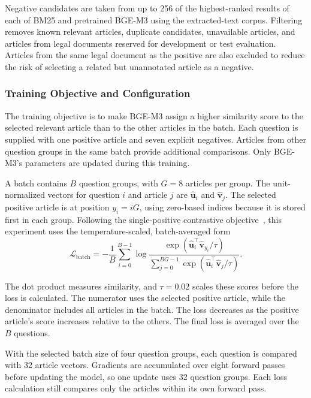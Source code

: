 Negative candidates are taken from up to 256 of the highest-ranked results of each of BM25 and pretrained BGE-M3 using the extracted-text corpus. Filtering removes known relevant articles, duplicate candidates, unavailable articles, and articles from legal documents reserved for development or test evaluation. Articles from the same legal document as the positive are also excluded to reduce the risk of selecting a related but unannotated article as a negative.




\subsubsection{Training Objective and Configuration}

The training objective is to make BGE-M3 assign a higher similarity score to the selected relevant article than to the other articles in the batch. Each question is supplied with one positive article and seven explicit negatives. Articles from other question groups in the same batch provide additional comparisons. Only BGE-M3's parameters are updated during this training.

A batch contains \(B\) question groups, with \(G=8\) articles per group. The unit-normalized vectors for question \(i\) and article \(j\) are \(\widehat{\mathbf{u}}_i\) and \(\widehat{\mathbf{v}}_j\). The selected positive article is at position \(y_i=iG\), using zero-based indices because it is stored first in each group. Following the single-positive contrastive objective~\cite{karpukhin2020}, this experiment uses the temperature-scaled, batch-averaged form
\[
\mathcal L_{\mathrm{batch}}=-\frac{1}{B}\sum_{i=0}^{B-1}
\log\frac{\exp(\widehat{\mathbf{u}}_i^\top\widehat{\mathbf{v}}_{y_i}/\tau)}
{\sum_{j=0}^{BG-1}\exp(\widehat{\mathbf{u}}_i^\top\widehat{\mathbf{v}}_j/\tau)}.
\]

The dot product measures similarity, and \(\tau=0.02\) scales these scores before the loss is calculated. The numerator uses the selected positive article, while the denominator includes all articles in the batch. The loss decreases as the positive article's score increases relative to the others. The final loss is averaged over the \(B\) questions.

With the selected batch size of four question groups, each question is compared with 32 article vectors. Gradients are accumulated over eight forward passes before updating the model, so one update uses 32 question groups. Each loss calculation still compares only the articles within its own forward pass.


